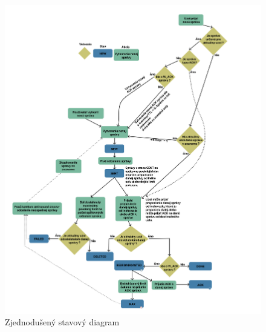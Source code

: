 \documentclass[slovak,master]{diploma}
\begin{document}
\printbibliography[title={Literatura}, heading=bibintoc]

\appendix
\begin{figure}[]
  \centering
  \includegraphics[width=1\textwidth]{Figures/state_flow_W.png}
  \caption{Zjednodušený stavový diagram}
  \label{fig:stateDiagram}
\end{figure}
\end{document}

